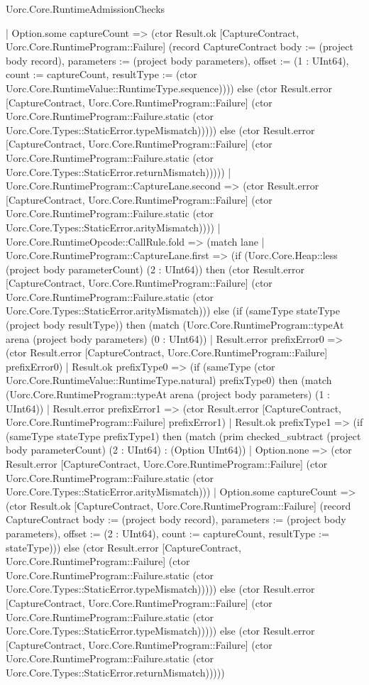 \begin{lexlean}{Uorc.Core.RuntimeAdmissionChecks}
\begin{semanticmodule}
{          | Option.some captureCount => (ctor Result.ok [CaptureContract, Uorc.Core.RuntimeProgram::Failure] (record CaptureContract {body := (project body record), parameters := (project body parameters), offset := (1 : UInt64), count := captureCount, resultType := (ctor Uorc.Core.RuntimeValue::RuntimeType.sequence)}))) else (ctor Result.error [CaptureContract, Uorc.Core.RuntimeProgram::Failure] (ctor Uorc.Core.RuntimeProgram::Failure.static (ctor Uorc.Core.Types::StaticError.typeMismatch))))) else (ctor Result.error [CaptureContract, Uorc.Core.RuntimeProgram::Failure] (ctor Uorc.Core.RuntimeProgram::Failure.static (ctor Uorc.Core.Types::StaticError.returnMismatch)))))
      | Uorc.Core.RuntimeProgram::CaptureLane.second => (ctor Result.error [CaptureContract, Uorc.Core.RuntimeProgram::Failure] (ctor Uorc.Core.RuntimeProgram::Failure.static (ctor Uorc.Core.Types::StaticError.arityMismatch))))
    | Uorc.Core.RuntimeOpcode::CallRule.fold => (match lane
      | Uorc.Core.RuntimeProgram::CaptureLane.first => (if (Uorc.Core.Heap::less (project body parameterCount) (2 : UInt64)) then (ctor Result.error [CaptureContract, Uorc.Core.RuntimeProgram::Failure] (ctor Uorc.Core.RuntimeProgram::Failure.static (ctor Uorc.Core.Types::StaticError.arityMismatch))) else (if (sameType stateType (project body resultType)) then (match (Uorc.Core.RuntimeProgram::typeAt arena (project body parameters) (0 : UInt64))
        | Result.error prefixError0 => (ctor Result.error [CaptureContract, Uorc.Core.RuntimeProgram::Failure] prefixError0)
        | Result.ok prefixType0 => (if (sameType (ctor Uorc.Core.RuntimeValue::RuntimeType.natural) prefixType0) then (match (Uorc.Core.RuntimeProgram::typeAt arena (project body parameters) (1 : UInt64))
          | Result.error prefixError1 => (ctor Result.error [CaptureContract, Uorc.Core.RuntimeProgram::Failure] prefixError1)
          | Result.ok prefixType1 => (if (sameType stateType prefixType1) then (match (prim checked_subtract (project body parameterCount) (2 : UInt64) : (Option UInt64))
            | Option.none => (ctor Result.error [CaptureContract, Uorc.Core.RuntimeProgram::Failure] (ctor Uorc.Core.RuntimeProgram::Failure.static (ctor Uorc.Core.Types::StaticError.arityMismatch)))
            | Option.some captureCount => (ctor Result.ok [CaptureContract, Uorc.Core.RuntimeProgram::Failure] (record CaptureContract {body := (project body record), parameters := (project body parameters), offset := (2 : UInt64), count := captureCount, resultType := stateType}))) else (ctor Result.error [CaptureContract, Uorc.Core.RuntimeProgram::Failure] (ctor Uorc.Core.RuntimeProgram::Failure.static (ctor Uorc.Core.Types::StaticError.typeMismatch))))) else (ctor Result.error [CaptureContract, Uorc.Core.RuntimeProgram::Failure] (ctor Uorc.Core.RuntimeProgram::Failure.static (ctor Uorc.Core.Types::StaticError.typeMismatch))))) else (ctor Result.error [CaptureContract, Uorc.Core.RuntimeProgram::Failure] (ctor Uorc.Core.RuntimeProgram::Failure.static (ctor Uorc.Core.Types::StaticError.returnMismatch)))))
}
\end{semanticmodule}
\end{lexlean}
